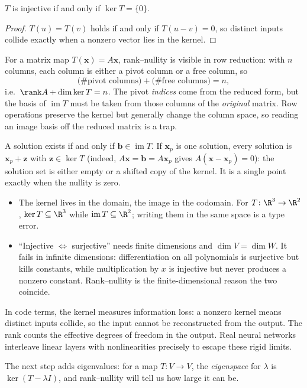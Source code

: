 \begin{corollary}\label{cor:injectivity-test}
$T$ is injective if and only if $\ker T=\{0\}$.
\end{corollary}

\begin{proof}
$T(u)=T(v)$ holds if and only if $T(u-v)=0$, so distinct inputs collide
exactly when a nonzero vector lies in the kernel.
\end{proof}

For a matrix map $T(\mathbf{x})=A\mathbf{x}$, rank--nullity is visible in
row reduction: with $n$ columns, each column is either a pivot column or
a free column, so
\[
  \text{(\# pivot columns)}+\text{(\# free columns)}=n,
\]
i.e.\ $\rank A+\dim\ker T=n$. The pivot \emph{indices} come from the
reduced form, but the basis of $\operatorname{im}T$ must be taken from
those columns of the \emph{original} matrix. Row operations preserve the
kernel but generally change the column space, so reading an image basis
off the reduced matrix is a trap.

\begin{remark}[Reading $A\mathbf{x}=\mathbf{b}$ through rank--nullity]
A solution exists if and only if $\mathbf{b}\in\operatorname{im}T$. If
$\mathbf{x}_p$ is one solution, every solution is
$\mathbf{x}_p+\mathbf{z}$ with $\mathbf{z}\in\ker T$ (indeed,
$A\mathbf{x}=\mathbf{b}=A\mathbf{x}_p$ gives $A(\mathbf{x}-\mathbf{x}_p)=0$): the solution set is
either empty or a shifted copy of the kernel. It is a single point
exactly when the nullity is zero.
\end{remark}

\begin{remark}
\begin{itemize}
  \item The kernel lives in the domain, the image in the codomain. For
    $T\colon\R^3\to\R^2$, $\ker T\subseteq\R^3$ while
    $\operatorname{im}T\subseteq\R^2$; writing them in the same space is
    a type error.
  \item ``Injective $\iff$ surjective'' needs finite dimensions and
    $\dim V=\dim W$. It fails in infinite dimensions: differentiation on
    all polynomials is surjective but kills constants, while
    multiplication by $x$ is injective but never produces a nonzero
    constant. Rank--nullity is the finite-dimensional reason the two
    coincide.
\end{itemize}
\end{remark}

In code terms, the kernel measures information loss: a nonzero kernel
means distinct inputs collide, so the input cannot be reconstructed from
the output. The rank counts the effective degrees of freedom in the
output. Real neural networks interleave linear layers with nonlinearities
precisely to escape these rigid limits.

The next step adds eigenvalues: for a map $T\colon V\to V$, the
\emph{eigenspace} for $\lambda$ is $\ker(T-\lambda I)$, and
rank--nullity will tell us how large it can be.
